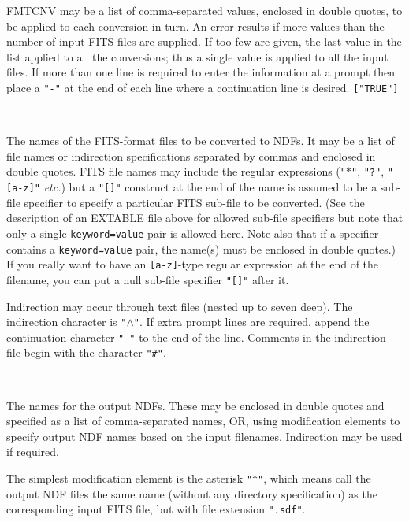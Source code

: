 \documentclass[twoside,11pt]{article}
\newcommand{\sstsubsection}[1]{ \item[{#1}] \mbox{} \\}
\newcommand{\sstsubsection}[1]{\item[{#1}]}
\begin{document}
{{{         FMTCNV may be a list of comma-separated values, enclosed in
	 double quotes, to be applied to each conversion in turn. An
	 error results if more values than the number of input FITS
	 files are supplied.  If too few are given, the last value in
	 the list applied to all the conversions; thus a single value
	 is applied to all the input files.  If more than one line is
	 required to enter the information at a prompt then place a
	 \texttt{"-"} at the end of each line where a continuation
	 line is desired.  \texttt{["TRUE"]}
      }
      \sstsubsection{
         IN = LITERAL (Read)
      }{
         The names of the FITS-format files to be converted to NDFs.
         It may be a list of file names or indirection specifications
         separated by commas and enclosed in double quotes.  FITS file
         names may include the regular expressions (\texttt{"$*$"},
         \texttt{"?"}, \texttt{"[a-z]"} {\em etc.})  but a \texttt{"[]"}
         construct at the end of the name is assumed to be
         a sub-file specifier to specify a particular FITS sub-file to
         be converted. (See the description of an EXTABLE file above for
         allowed sub-file specifiers but note that only a single 
         \texttt{keyword=value} pair is allowed here.  Note also that if a
         specifier contains a \texttt{keyword=value} pair, the name(s) must
         be enclosed in double quotes.)
         If you really want to have an \texttt{[a-z]}-type regular expression
         at the end of the filename, you can put a null sub-file specifier 
         \texttt{"[]"} after it.

         Indirection may occur
         through text files (nested up to seven deep).  The indirection
         character is \texttt{"$\wedge$"}.  If extra prompt lines are
         required, append the continuation character \texttt{"-"} to the
         end of the line.  Comments
         in the indirection file begin with the character \texttt{"\#"}.
      }
      \sstsubsection{
         OUT = LITERAL (Write)
      }{
         The names for the output NDFs.  These may be enclosed in
         double quotes and specified as a list of comma-separated names,
         OR, using modification elements to specify output NDF names
         based on the input filenames.  Indirection may be used if
         required.

         The simplest modification element is the asterisk \texttt{"$*$"},
         which means call the output NDF files the same name (without any
         directory specification) as the corresponding input FITS file,
         but with file extension \texttt{".sdf"}.

}}}
\end{document}
